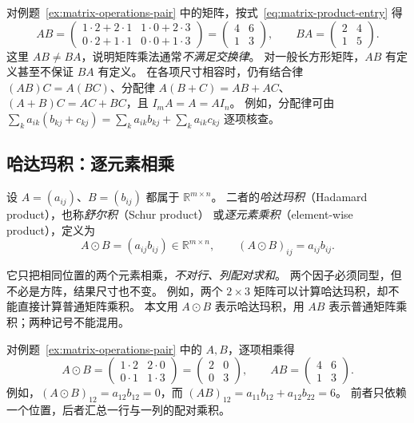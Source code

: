 \documentclass[UTF8,12pt,a4paper,fontset=fandol]{ctexart}
\begin{document}
对例题~\ref{ex:matrix-operations-pair} 中的矩阵，按式~\eqref{eq:matrix-product-entry} 得
\[
  AB=\begin{pmatrix}1\cdot2+2\cdot1&1\cdot0+2\cdot3\\
                     0\cdot2+1\cdot1&0\cdot0+1\cdot3\end{pmatrix}
     =\begin{pmatrix}4&6\\1&3\end{pmatrix},\qquad
  BA=\begin{pmatrix}2&4\\1&5\end{pmatrix}.
\]
这里 $AB\ne BA$，说明矩阵乘法通常\emph{不满足交换律}。
对一般长方形矩阵，$AB$ 有定义甚至不保证 $BA$ 有定义。
在各项尺寸相容时，仍有结合律 $(AB)C=A(BC)$、分配律
$A(B+C)=AB+AC$、$(A+B)C=AC+BC$，且 $I_mA=A=AI_n$。
例如，分配律可由 $\sum_k a_{ik}(b_{kj}+c_{kj})
=\sum_k a_{ik}b_{kj}+\sum_k a_{ik}c_{kj}$ 逐项核查。

\subsection{哈达玛积：逐元素相乘}
\label{subsec:matrix-hadamard-product}

\begin{definition}[哈达玛积]
设 $A=(a_{ij})$、$B=(b_{ij})$ 都属于 $\mathbb R^{m\times n}$。
二者的\emph{哈达玛积}（Hadamard product），也称\emph{舒尔积}（Schur product）
或\emph{逐元素乘积}（element-wise product），定义为
\begin{equation}
  A\odot B=(a_{ij}b_{ij})\in\mathbb R^{m\times n},\qquad
  (A\odot B)_{ij}=a_{ij}b_{ij}.
  \label{eq:matrix-hadamard-product}
\end{equation}
\end{definition}

它只把相同位置的两个元素相乘，\emph{不对行、列配对求和}。
两个因子必须同型，但不必是方阵，结果尺寸也不变。
例如，两个 $2\times3$ 矩阵可以计算哈达玛积，却不能直接计算普通矩阵乘积。
本文用 $A\odot B$ 表示哈达玛积，用 $AB$ 表示普通矩阵乘积；两种记号不能混用。

\begin{example}[与普通矩阵乘积比较]
对例题~\ref{ex:matrix-operations-pair} 中的 $A,B$，逐项相乘得
\[
  A\odot B
  =\begin{pmatrix}1\cdot2&2\cdot0\\0\cdot1&1\cdot3\end{pmatrix}
  =\begin{pmatrix}2&0\\0&3\end{pmatrix},\qquad
  AB=\begin{pmatrix}4&6\\1&3\end{pmatrix}.
\]
例如，$(A\odot B)_{12}=a_{12}b_{12}=0$，而
$(AB)_{12}=a_{11}b_{12}+a_{12}b_{22}=6$。
前者只依赖一个位置，后者汇总一行与一列的配对乘积。
\end{example}
\end{document}
